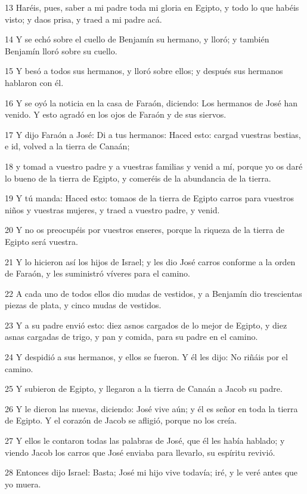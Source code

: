 \par 13 Haréis, pues, saber a mi padre toda mi gloria en Egipto, y todo lo que habéis visto; y daos prisa, y traed a mi padre acá.
\par 14 Y se echó sobre el cuello de Benjamín su hermano, y lloró; y también Benjamín lloró sobre su cuello.
\par 15 Y besó a todos sus hermanos, y lloró sobre ellos; y después sus hermanos hablaron con él.
\par 16 Y se oyó la noticia en la casa de Faraón, diciendo: Los hermanos de José han venido. Y esto agradó en los ojos de Faraón y de sus siervos.
\par 17 Y dijo Faraón a José: Di a tus hermanos: Haced esto: cargad vuestras bestias, e id, volved a la tierra de Canaán;
\par 18 y tomad a vuestro padre y a vuestras familias y venid a mí, porque yo os daré lo bueno de la tierra de Egipto, y comeréis de la abundancia de la tierra.
\par 19 Y tú manda: Haced esto: tomaos de la tierra de Egipto carros para vuestros niños y vuestras mujeres, y traed a vuestro padre, y venid.
\par 20 Y no os preocupéis por vuestros enseres, porque la riqueza de la tierra de Egipto será vuestra.
\par 21 Y lo hicieron así los hijos de Israel; y les dio José carros conforme a la orden de Faraón, y les suministró víveres para el camino.
\par 22 A cada uno de todos ellos dio mudas de vestidos, y a Benjamín dio trescientas piezas de plata, y cinco mudas de vestidos.
\par 23 Y a su padre envió esto: diez asnos cargados de lo mejor de Egipto, y diez asnas cargadas de trigo, y pan y comida, para su padre en el camino.
\par 24 Y despidió a sus hermanos, y ellos se fueron. Y él les dijo: No riñáis por el camino.
\par 25 Y subieron de Egipto, y llegaron a la tierra de Canaán a Jacob su padre.
\par 26 Y le dieron las nuevas, diciendo: José vive aún; y él es señor en toda la tierra de Egipto. Y el corazón de Jacob se afligió, porque no los creía.
\par 27 Y ellos le contaron todas las palabras de José, que él les había hablado; y viendo Jacob los carros que José enviaba para llevarlo, su espíritu revivió.
\par 28 Entonces dijo Israel: Basta; José mi hijo vive todavía; iré, y le veré antes que yo muera.

